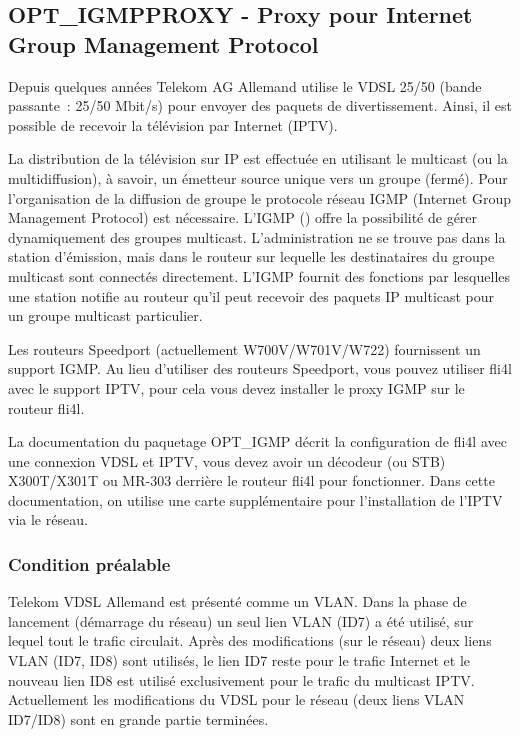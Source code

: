 \subsection{OPT\_IGMPPROXY - Proxy pour Internet Group Management Protocol}

Depuis quelques années Telekom AG Allemand utilise le VDSL 25/50 (bande passante~:
25/50 Mbit/s) pour envoyer des paquets de divertissement. Ainsi, il est possible
de recevoir la télévision par Internet (IPTV).

La distribution de la télévision sur IP est effectuée en utilisant le multicast
(ou la multidiffusion), à savoir, un émetteur source unique vers un groupe (fermé).
Pour l'organisation de la diffusion de groupe le protocole réseau IGMP (Internet Group
Management Protocol) est nécessaire. L'IGMP 
()
offre la possibilité de gérer dynamiquement des groupes multicast. L'administration
ne se trouve pas dans la station d'émission, mais dans le routeur sur lequelle les
destinataires du groupe multicast sont connectés directement. L'IGMP fournit des
fonctions par lesquelles une station notifie au routeur qu'il peut recevoir des paquets
IP multicast pour un groupe multicast particulier.

Les routeurs Speedport (actuellement W700V/W701V/W722) fournissent un support IGMP. Au
lieu d'utiliser des routeurs Speedport, vous pouvez utiliser fli4l avec le support IPTV,
pour cela vous devez installer le proxy IGMP sur le routeur fli4l.

La documentation du paquetage OPT\_IGMP décrit la configuration de fli4l avec une connexion
VDSL et IPTV, vous devez avoir un décodeur (ou STB) X300T/X301T ou MR-303 derrière le routeur
fli4l pour fonctionner. Dans cette documentation, on utilise une carte supplémentaire pour
l'installation de l'IPTV via le réseau.

\subsubsection{Condition préalable}

Telekom VDSL Allemand est présenté comme un VLAN. Dans la phase de lancement (démarrage du
réseau) un seul lien VLAN (ID7) a été utilisé, sur lequel tout le trafic circulait.
Après des modifications (sur le réseau) deux liens VLAN (ID7, ID8) sont utilisés, le lien ID7
reste pour le trafic Internet et le nouveau lien ID8 est utilisé exclusivement pour le trafic
du multicast IPTV. Actuellement les modifications du VDSL pour le réseau (deux liens VLAN ID7/ID8)
sont en grande partie terminées.

